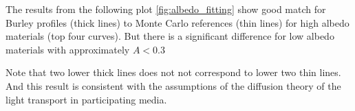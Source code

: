 The results from the following plot \ref{fig:albedo_fitting} show good match for
Burley profiles (thick lines) to Monte Carlo references (thin lines) for high albedo materials (top
four curves). But there is a significant difference for low albedo materials
with approximately $A<0.3$

Note that two lower thick lines does not not correspond to lower two thin lines.
And this result is consistent with the assumptions of the diffusion theory of
the light transport in participating media.